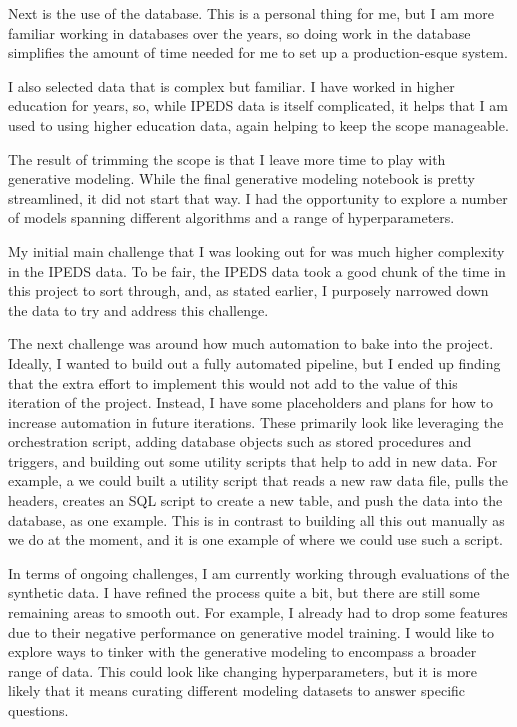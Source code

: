 \documentclass[sigconf, authorversion, nonacm]{acmart}
\begin{document}
    Next is the use of the database. This is a personal thing for me, but I am more familiar working in databases over the years, so doing work in the database simplifies the amount of time needed for me to set up a production-esque system.

    I also selected data that is complex but familiar. I have worked in higher education for years, so, while IPEDS data is itself complicated, it helps that I am used to using higher education data, again helping to keep the scope manageable.

    The result of trimming the scope is that I leave more time to play with generative modeling. While the final generative modeling notebook is pretty streamlined, it did not start that way. I had the opportunity to explore a number of models spanning different algorithms and a range of hyperparameters.

    My initial main challenge that I was looking out for was much higher complexity in the IPEDS data. To be fair, the IPEDS data took a good chunk of the time in this project to sort through, and, as stated earlier, I purposely narrowed down the data to try and address this challenge.

    The next challenge was around how much automation to bake into the project. Ideally, I wanted to build out a fully automated pipeline, but I ended up finding that the extra effort to implement this would not add to the value of this iteration of the project. Instead, I have some placeholders and plans for how to increase automation in future iterations. These primarily look like leveraging the orchestration script, adding database objects such as stored procedures and triggers, and building out some utility scripts that help to add in new data. For example, a we could built a utility script that reads a new raw data file, pulls the headers, creates an SQL script to create a new table, and push the data into the database, as one example. This is in contrast to building all this out manually as we do at the moment, and it is one example of where we could use such a script.

    In terms of ongoing challenges, I am currently working through evaluations of the synthetic data. I have refined the process quite a bit, but there are still some remaining areas to smooth out. For example, I already had to drop some features due to their negative performance on generative model training. I would like to explore ways to tinker with the generative modeling to encompass a broader range of data. This could look like changing hyperparameters, but it is more likely that it means curating different modeling datasets to answer specific questions.
\end{document}
